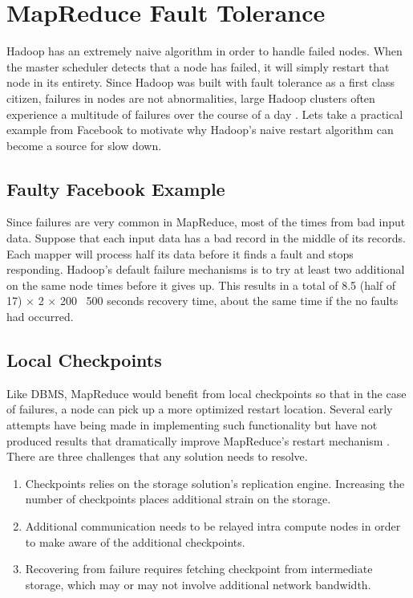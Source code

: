 \documentclass[10pt,twocolumn]{IEEEtran11}
\begin{document}
\section{MapReduce Fault Tolerance}

Hadoop has an extremely naive algorithm in order to handle failed nodes.   When the master scheduler detects that a node has failed, it will simply restart that node in its entirety.  Since Hadoop was built with fault tolerance as a first class citizen, failures in nodes are not abnormalities, large Hadoop clusters often experience a multitude of  failures over the course of a day  \cite{bibid}.  Lets take a practical example from Facebook to motivate why Hadoop's naive restart algorithm can become a source for slow down.

\subsection{Faulty Facebook Example}

Since failures are very common in MapReduce, most of the times from bad input data.  Suppose that each input data has a bad record in the middle of its records.  Each mapper will process half its data before it finds a fault and stops responding.  Hadoop's default failure mechanisms is to try at least two additional on the same node times before it gives up.  This results in a total of 8.5 (half of 17) × 2 × 200 ~500 seconds recovery time, about the same time if the no faults had occurred.

\subsection{Local Checkpoints}

Like DBMS, MapReduce would benefit from local checkpoints so that in the case of failures, a node can pick up a more optimized restart location.  Several early attempts have being made in implementing such functionality but have not produced results that dramatically improve MapReduce's restart mechanism \cite{yang2010osprey}.  There are three challenges that any solution needs to resolve.
\  \\
\begin{enumerate}
	\setlength\itemsep{1em}
	\item Checkpoints relies on the storage solution's replication engine.  Increasing the number of checkpoints places additional strain on the storage.
	\item Additional communication needs to be relayed intra compute nodes in order to make aware of the additional checkpoints.
	\item Recovering from failure requires fetching checkpoint from intermediate storage, which may or may not involve additional network bandwidth.
\end{enumerate}
\end{document}
